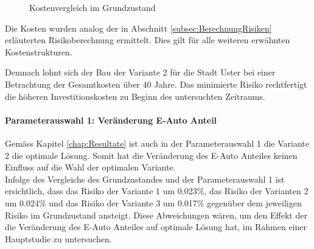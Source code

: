 \begin{figure}[h!]
  \centering
  \hfill
\caption[Kostenvergleich Grundzustand]{Kostenvergleich im Grundzustand}
  \label{img:KostenZ0}
\end{figure}

\begin{IMleftrightskip}
Die Kosten wurden analog der in Abschnitt \ref{subsec:BerechnungRisiken} erläuterten Risikoberechnung ermittelt. Dies gilt für alle weiteren erwähnten Kostenstrukturen.
\end{IMleftrightskip}

Demnach lohnt sich der Bau der Variante 2 für die Stadt Uster bei einer Betrachtung der Gesamtkosten über 40 Jahre. Das minimierte Risiko rechtfertigt die höheren Investitionskosten zu Beginn des untersuchten Zeitraums. 

\paragraph{Parameterauswahl 1: Veränderung E-Auto Anteil}

Gemäss Kapitel \ref{chap:Resultate} ist auch in der Parameterauswahl 1 die Variante 2 die optimale Lösung. Somit hat die Veränderung des E-Auto Anteiles keinen Einfluss auf die Wahl der optimalen Variante. \\
Infolge des Vergleichs des Grundzustandes und der Parameterauswahl 1 ist ersichtlich, dass das Risiko der Variante 1 um 0.023\%, das Risiko der Varianten 2 um 0.024\% und das Risiko der Variante 3 um 0.017\% gegenüber dem jeweiligen Risiko im Grundzustand ansteigt. Diese Abweichungen wären, um den Effekt der die Veränderung des E-Auto Anteiles auf optimale Lösung hat, im Rahmen einer Hauptstudie zu untersuchen.

